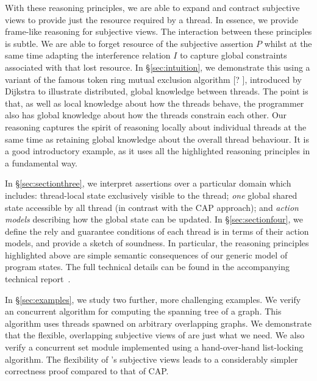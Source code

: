 





With these reasoning principles, we are able to expand and contract
subjective views  to provide just the resource required by a thread.
In essence, we provide  frame-like reasoning for  subjective  views. 
The interaction between  these principles is
subtle. We are able to forget resource of the subjective assertion $P$
 whilst at the same time adapting the interference relation $I$  to
capture global constraints associated with that lost resource. In 
\S\ref{sec:intuition}, we 
demonstrate this using 
a variant of the famous  token ring mutual exclusion algorithm [? ],
introduced by Dijkstra to illustrate distributed, global knowledge between
threads. The point is that, as well as local knowledge
about how the threads behave, the programmer also has global knowledge
about how the threads constrain each other. Our reasoning captures the
spirit of reasoning locally about individual threads at the same time
as retaining global knowledge about the overall thread behaviour. It
is a good  introductory example, as it uses all the highlighted \colosl
reasoning principles in a fundamental way. 


In \S\ref{sec:sectionthree}, we interpret \colosl assertions
 over a particular domain which includes: thread-local
state exclusively visible to the thread; {\em one} global shared state
accessible by all thread (in contrast with the CAP approach); and {\em
  action models} describing how the global state can be updated.  In
\S\ref{sec:sectionfour}, we define the rely and guarantee conditions
of each thread is in terms of their action models, and provide a
sketch of soundness. In particular, the
reasoning principles highlighted above are simple semantic
consequences of our generic model of program states.  The full
technical details can
be found 
in the accompanying technical report~\cite{.}.



In \S\ref{sec:examples}, we 
study two further, more challenging examples. We verify an concurrent algorithm for
computing the spanning tree of a graph. This algorithm uses threads
spawned on arbitrary overlapping graphs. We demonstrate that the flexible, overlapping
subjective views of \colosl are just what we need. 
We also verify a concurrent set module
implemented using a hand-over-hand list-locking
algorithm. 
The flexibility of \colosl's subjective views  leads to a
considerably simpler correctness proof   compared to that of CAP. 

